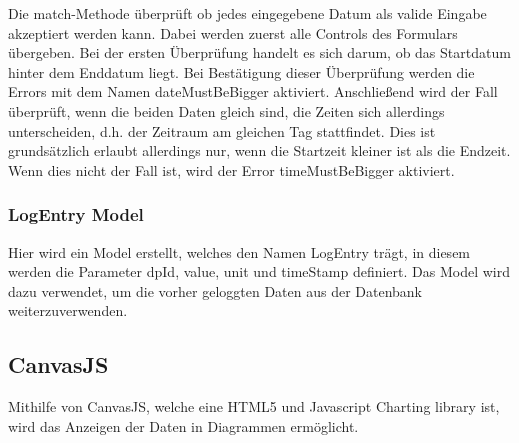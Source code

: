 Die match-Methode überprüft ob jedes eingegebene Datum als valide Eingabe akzeptiert werden kann. Dabei werden zuerst alle Controls des Formulars übergeben. Bei der ersten Überprüfung handelt es sich darum, ob das Startdatum hinter dem Enddatum liegt. Bei Bestätigung dieser Überprüfung werden die Errors mit dem Namen dateMustBeBigger aktiviert. Anschließend wird der Fall überprüft, wenn die beiden Daten gleich sind, die Zeiten sich allerdings unterscheiden, d.h. der Zeitraum am gleichen Tag stattfindet. Dies ist grundsätzlich erlaubt allerdings nur, wenn die Startzeit kleiner ist als die Endzeit. Wenn dies nicht der Fall ist, wird der Error timeMustBeBigger aktiviert.

\subsubsection{LogEntry Model}
Hier wird ein Model erstellt, welches den Namen LogEntry trägt, in diesem werden die Parameter dpId, value, unit und timeStamp definiert. Das Model wird dazu verwendet, um die vorher geloggten Daten aus der Datenbank weiterzuverwenden. 

\subsection{CanvasJS}
Mithilfe von CanvasJS, welche eine HTML5 und Javascript Charting library ist, wird das Anzeigen der Daten in Diagrammen ermöglicht. 